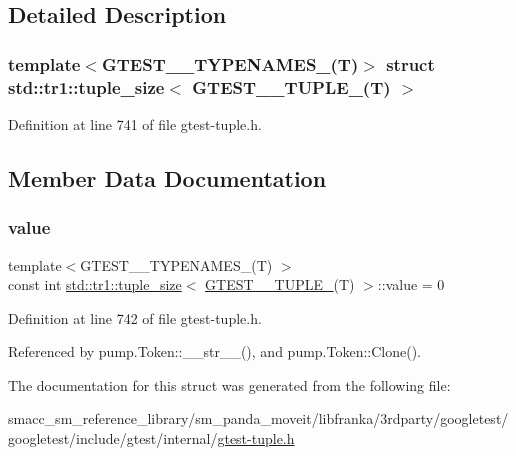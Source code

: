 \subsection{Detailed Description}
\subsubsection*{template$<$G\+T\+E\+S\+T\+\_\+\_\+\+T\+Y\+P\+E\+N\+A\+M\+E\+S\+\_\+(\+T)$>$\newline
struct std\+::tr1\+::tuple\+\_\+size$<$ G\+T\+E\+S\+T\+\_\+\_\+\+T\+U\+P\+L\+E\+\_\+(\+T) $>$}



Definition at line 741 of file gtest-\/tuple.\+h.



\subsection{Member Data Documentation}
\mbox{\label{structstd_1_1tr1_1_1tuple__size_3_01GTEST__0__TUPLE___07T_08_01_4_af34d6d0b87d7379b14817a386c1e18ee}} 
\subsubsection{\texorpdfstring{value}{value}}
{\footnotesize\ttfamily template$<$G\+T\+E\+S\+T\+\_\+\_\+\+T\+Y\+P\+E\+N\+A\+M\+E\+S\+\_\+(\+T) $>$ \\
const int \hyperlink{structstd_1_1tr1_1_1tuple__size}{std\+::tr1\+::tuple\+\_\+size}$<$ \hyperlink{gtest-tuple_8h_acecddf48fa29ec4b0199d5a467e89778}{G\+T\+E\+S\+T\+\_\+\_\+\+T\+U\+P\+L\+E\+\_\+}(T) $>$\+::value = 0\hspace{0.3cm}{\ttfamily [static]}}



Definition at line 742 of file gtest-\/tuple.\+h.



Referenced by pump.\+Token\+::\+\_\+\+\_\+str\+\_\+\+\_\+(), and pump.\+Token\+::\+Clone().



The documentation for this struct was generated from the following file\+:\begin{DoxyCompactItemize}
\item 
smacc\+\_\+sm\+\_\+reference\+\_\+library/sm\+\_\+panda\+\_\+moveit/libfranka/3rdparty/googletest/googletest/include/gtest/internal/\hyperlink{gtest-tuple_8h}{gtest-\/tuple.\+h}\end{DoxyCompactItemize}
